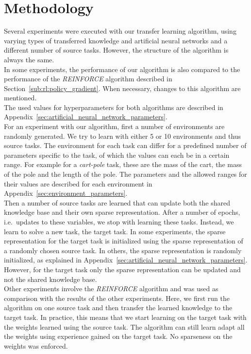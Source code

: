 \section{Methodology} %
\label{sub:methodology}
Several experiments were executed with our transfer learning algorithm, using varying types of transferred knowledge and artificial neural networks and a different number of source tasks. However, the structure of the algorithm is always the same.\\
In some experiments, the performance of our algorithm is also compared to the performance of the \textit{REINFORCE} algorithm described in Section~\ref{sub:rl:policy_gradient}. When necessary, changes to this algorithm are mentioned.\\
The used values for hyperparameters for both algorithms are described in Appendix~\ref{sec:artificial_neural_network_parameters}.\\

For an experiment with our algorithm, first a number of environments are randomly generated. We try to learn with either 5 or 10 environments and thus source tasks.
The environment for each task can differ for a predefined number of parameters specific to the task, of which the values can each be in a certain range. For example for a \emph{cart-pole} task, these are the mass of the cart, the mass of the pole and the length of the pole.
The parameters and the allowed ranges for their values are described for each environment in Appendix~\ref{sec:environment_parameters}.\\
Then a number of source tasks are learned that can update both the shared knowledge base and their own sparse representation.
After a number of epochs, i.e.\ updates to these variables, we stop with learning these tasks.
Instead, we learn to solve a new task, the target task.
In some experiments, the sparse representation for the target task is initialized using the sparse representation of a randomly chosen source task.
In others, the sparse representation is randomly initialized, as explained in Appendix~\ref{sec:artificial_neural_network_parameters}.
However, for the target task only the sparse representation can be updated and not the shared knowledge base.\\

Other experiments involve the \textit{REINFORCE} algorithm and was used as comparison with the results of the other experiments.
Here, we first run the algorithm on one source task and then transfer the learned knowledge to the target task.
In practice, this means that we start learning on the target task with the weights learned using the source task.
The algorithm can still learn adapt all the weights using experience gained on the target task.
No sparseness on the weights was enforced.\\

